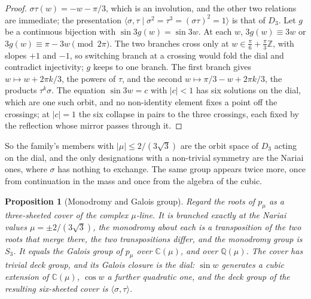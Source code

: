 \documentclass[11pt]{article}
\theoremstyle{plain}
\newtheorem{proposition}[theorem]{Proposition}
\theoremstyle{definition}
\theoremstyle{remark}
\begin{document}
\begin{proof}
$\sigma\tau(w)=-w-\pi/3$, which is an involution, and the other two relations are immediate; the presentation
$\langle\sigma,\tau\mid\sigma^{2}=\tau^{3}=(\sigma\tau)^{2}=1\rangle$ is that of $D_{3}$. Let $g$ be a continuous bijection with
$\sin3g(w)=\sin3w$. At each $w$, $3g(w)\equiv3w$ or $3g(w)\equiv\pi-3w\pmod{2\pi}$. The two branches cross only at
$w\in\tfrac{\pi}{6}+\tfrac{\pi}{3}\mathbb{Z}$, with slopes $+1$ and $-1$, so switching branch at a crossing would fold the
dial and contradict injectivity; $g$ keeps to one branch. The first branch gives $w\mapsto w+2\pi k/3$, the powers
of $\tau$, and the second $w\mapsto\pi/3-w+2\pi k/3$, the products $\tau^{k}\sigma$. The equation $\sin3w=c$ with
$|c|<1$ has six solutions on the dial, which are one such orbit, and no non-identity element fixes a point
off the crossings; at $|c|=1$ the six collapse in pairs to the three crossings, each fixed by the reflection
whose mirror passes through it.
\end{proof}

So the family's members with $|\mu|\le2/(3\sqrt3)$ are the orbit space of $D_{3}$ acting on the dial, and the only
designations with a non-trivial symmetry are the Nariai ones, where $\sigma$ has nothing to exchange. The same
group appears twice more, once from continuation in the mass and once from the algebra of the cubic.

\begin{proposition}[Monodromy and Galois group]\label{prop:monodromy}
Regard the roots of $p_{\mu}$ as a three-sheeted cover of the complex $\mu$-line. It is branched exactly at the
Nariai values $\mu=\pm2/(3\sqrt3)$, the monodromy about each is a transposition of the two roots that merge
there, the two transpositions differ, and the monodromy group is $S_{3}$. It equals the Galois group of $p_{\mu}$
over $\mathbb{C}(\mu)$, and over $\mathbb{Q}(\mu)$. The cover has trivial deck group, and its Galois closure is the
dial: $\sin w$ generates a cubic extension of $\mathbb{C}(\mu)$, $\cos w$ a further quadratic one, and the deck group
of the resulting six-sheeted cover is $\langle\sigma,\tau\rangle$.
\end{proposition}
\end{document}
